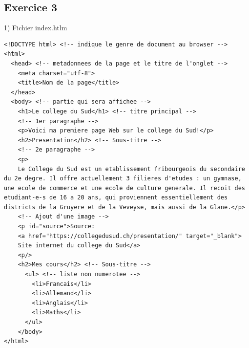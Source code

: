 \documentclass[a4paper,11pt]{article}
\begin{document}
\subsection{Exercice 3}
1) Fichier index.htlm
\begin{lstlisting}
<!DOCTYPE html> <!-- indique le genre de document au browser -->
<html>
  <head> <!-- metadonnees de la page et le titre de l'onglet -->
    <meta charset="utf-8">
    <title>Nom de la page</title>
  </head>
  <body> <!-- partie qui sera affichee -->
    <h1>Le college du Sud</h1> <!-- titre principal -->
    <!-- 1er paragraphe -->
    <p>Voici ma premiere page Web sur le college du Sud!</p>
    <h2>Presentation</h2> <!-- Sous-titre -->
    <!-- 2e paragraphe -->
    <p>
    Le College du Sud est un etablissement fribourgeois du secondaire du 2e degre. Il offre actuellement 3 filieres d'etudes : un gymnase, une ecole de commerce et une ecole de culture generale. Il recoit des etudiant-e-s de 16 a 20 ans, qui proviennent essentiellement des districts de la Gruyere et de la Veveyse, mais aussi de la Glane.</p>
    <!-- Ajout d'une image -->
    <p id="source">Source:
    <a href="https://collegedusud.ch/presentation/" target="_blank">
    Site internet du college du Sud</a>
    <p/>
    <h2>Mes cours</h2> <!-- Sous-titre -->
      <ul> <!-- liste non numerotee -->
        <li>Francais</li>
        <li>Allemand</li>
        <li>Anglais</li>
        <li>Maths</li>
      </ul>
    </body>
</html>
\end{lstlisting}
\end{document}
